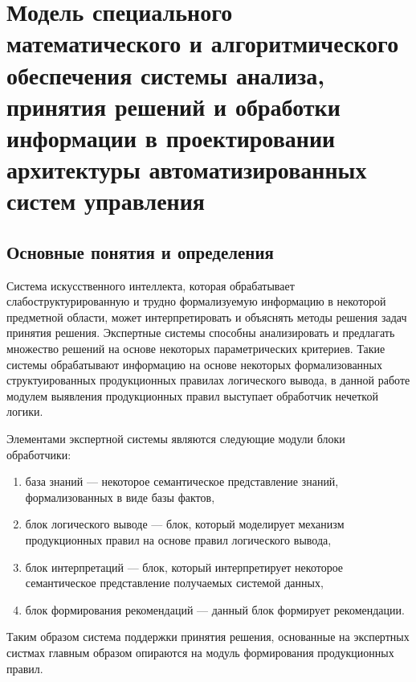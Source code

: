 \chapter{Модель специального математического и алгоритмического обеспечения системы анализа, принятия решений и обработки информации в проектировании архитектуры автоматизированных систем управления}\label{ch:ch3}
\section{Основные понятия и определения}\label{sec:ch3/sec1}
Система искусственного интеллекта, которая обрабатывает слабоструктурированную и трудно формализуемую информацию в некоторой предметной области, может интерпретировать и объяснять методы решения задач принятия решения. Экспертные системы способны анализировать и предлагать множество решений на основе некоторых параметрических критериев. Такие системы обрабатывают информацию на основе некоторых формализованных структуированных продукционных правилах логического вывода, в данной работе модулем выявления продукционных правил выступает обработчик нечеткой логики.


Элементами экспертной системы являются следующие модули блоки обработчики:
\begin{enumerate}
    \item база знаний — некоторое семантическое представление знаний, формализованных в виде базы фактов,
    \item блок логического выводе — блок, который моделирует механизм продукционных правил на основе правил логического вывода,
    \item блок интерпретаций — блок, который интерпретирует некоторое семантическое представление получаемых системой данных,
    \item блок формирования рекомендаций — данный блок формирует рекомендации.
\end{enumerate}
Таким образом система поддержки принятия решения, основанные на экспертных систмах главным образом опираются на модуль формирования продукционных правил.


